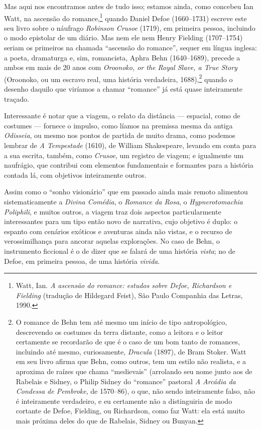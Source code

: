 Mas aqui nos encontramos antes de tudo isso; estamos ainda, como
concebeu Ian Watt, na ascensão do romance,\footnote{Watt, Ian. \emph{A
  ascensão do romance: estudos sobre Defoe, Richardson e Fielding}
  (tradução de Hildegard Feist), São Paulo Companhia das Letras, 1990.}
quando Daniel Defoe (1660--1731) escreve este seu livro sobre o náufrago
\emph{Robinson Crusoe} (1719), em primeira pessoa, incluindo o modo
epistolar de um diário. Mas nem ele nem Henry Fielding (1707--1754)
seriam os primeiros na chamada ``ascensão do romance'', sequer em língua
inglesa: a poeta, dramaturga e, sim, romancista, Aphra Behn (1640--1689),
precede a ambos em mais de 20 anos com \emph{Oroonoko, or the Royal
Slave, a True Story} (Oroonoko, ou um escravo real, uma história
verdadeira, 1688),\footnote{O romance de Behn tem até mesmo um início de
  tipo antropológico, descrevendo os costumes da terra distante, como a
  leitora e o leitor certamente se recordarão de que é o caso de um bom
  tanto de romances, incluindo até mesmo, curiosamente, \emph{Dracula}
  (1897), de Bram Stoker. Watt em seu livro afirma que Behn, como
  outros, tem um estilo não realista, e a aproxima de raízes que chama
  ``medievais'' (arrolando seu nome junto aos de Rabelais e Sidney, o
  Philip Sidney do ``romance'' pastoral \emph{A Arcádia da Condessa de
  Pembroke}, de 1570--86), o que, não sendo inteiramente falso, não é
  inteiramente verdadeiro, e eu certamente não a distinguiria de modo
  cortante de Defoe, Fielding, ou Richardson, como faz Watt: ela está
  muito mais próxima deles do que de Rabelais, Sidney ou Bunyan.}
quando o desenho daquilo que viríamos a chamar ``romance'' já está quase
inteiramente traçado.

Interessante é notar que a viagem, o relato da distância --- espacial,
como de costumes --- fornece o impulso, como líamos na premissa mesma da
antiga \emph{Odisseia}, ou mesmo nos pontos de partida de muito drama,
como podemos lembrar de \emph{A Tempestade} (1610), de William
Shakespeare, levando em conta para a sua escrita, também, como
\emph{Crusoe}, um registro de viagem; e igualmente um naufrágio, que
contribui com elementos fundamentais e formantes para a história contada
lá, com objetivos inteiramente outros.


Assim como o ``sonho visionário'' que em passado ainda mais remoto
alimentou sistematicamente a \emph{Divina Comédia}, o \emph{Romance da
Rosa}, o \emph{Hypnerotomachia Poliphili}, e muitos outros, a viagem
traz dois aspectos particularmente interessantes para um tipo então novo
de narrativa, cujo objetivo é duplo: o espanto com cenários exóticos e
aventuras ainda não vistas, e o recurso de verossimilhança para ancorar
aquelas explorações. No caso de Behn, o instrumento ficcional é o de
dizer que se falará de uma história \emph{vista}; no de Defoe, em
primeira pessoa, de uma história \emph{vivida}.

